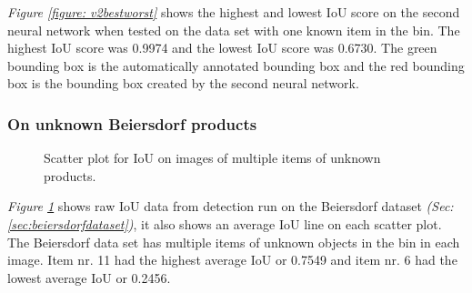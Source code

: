 \textit{Figure \ref{figure: v2bestworst}} shows the highest and lowest IoU score on the second neural network when tested on the data set with one known item in the bin. The highest IoU score was 0.9974 and the lowest IoU score was 0.6730. The green bounding box is the automatically annotated bounding box and the red bounding box is the bounding box created by the second neural network.

\clearpage
\subsubsection{On unknown Beiersdorf products}\label{subsec:v2resunknownprod}

\begin{figure}[h]
 \centering
 \hfill
 \caption{Scatter plot for IoU on images of multiple items of unknown products.}
 \label{figure: v2unknownproducts}
\end{figure}

\textit{Figure \ref{figure: v2unknownproducts}} shows raw IoU data from detection run on the Beiersdorf dataset \textit{(Sec: \ref{sec:beiersdorfdataset})}, it also shows an average IoU line on each scatter plot. The Beiersdorf data set has multiple items of unknown objects in the bin in each image.
Item nr. 11 had the highest average IoU or 0.7549 and item nr. 6 had the lowest average IoU or 0.2456. 


